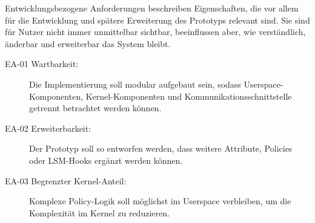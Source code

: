 Entwicklungsbezogene Anforderungen beschreiben Eigenschaften, die vor allem für die Entwicklung und spätere Erweiterung des Prototyps relevant sind. 
Sie sind für Nutzer nicht immer unmittelbar sichtbar, beeinflussen aber, wie verständlich, änderbar und erweiterbar das System bleibt.

\begin{description}
    \item[EA-01 Wartbarkeit:]
    Die Implementierung soll modular aufgebaut sein, sodass Userspace-Komponenten, Kernel-Komponenten und Kommunikationsschnittstelle getrennt betrachtet werden können.

    \item[EA-02 Erweiterbarkeit:]
    Der Prototyp soll so entworfen werden, dass weitere Attribute, Policies oder LSM-Hooks ergänzt werden können.

    \item[EA-03 Begrenzter Kernel-Anteil:]
    Komplexe Policy-Logik soll möglichst im Userspace verbleiben, um die Komplexität im Kernel zu reduzieren.
\end{description}




\newpage
